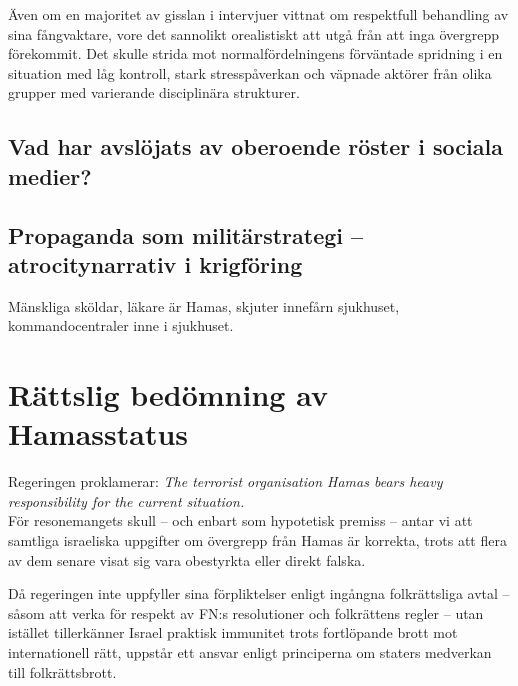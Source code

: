 \documentclass[12pt]{article}
\begin{document}
Även om en majoritet av gisslan i intervjuer vittnat om respektfull behandling av sina fångvaktare, vore det sannolikt orealistiskt att utgå från att inga övergrepp förekommit. Det skulle strida mot normalfördelningens förväntade spridning i en situation med låg kontroll, stark stresspåverkan och väpnade aktörer från olika grupper med varierande disciplinära strukturer.


\subsection*{Vad har avslöjats av oberoende röster i sociala medier?}

\subsection*{Propaganda som militärstrategi – atrocitynarrativ i krigföring}

Mänskliga sköldar, läkare är Hamas, skjuter innefårn sjukhuset, kommandocentraler inne i sjukhuset.



\section{Rättslig bedömning av Hamasstatus}

Regeringen proklamerar:
\textit{The terrorist organisation Hamas bears heavy responsibility for the current situation. }\\

För resonemangets skull – och enbart som hypotetisk premiss – antar vi att samtliga israeliska uppgifter om övergrepp från Hamas är korrekta, trots att flera av dem senare visat sig vara obestyrkta eller direkt falska.


Då regeringen inte uppfyller sina förpliktelser enligt ingångna folkrättsliga avtal – såsom att verka för respekt av FN:s resolutioner och folkrättens regler – utan istället tillerkänner Israel praktisk immunitet trots fortlöpande brott mot internationell rätt, uppstår ett ansvar enligt principerna om staters medverkan till folkrättsbrott.
\end{document}
